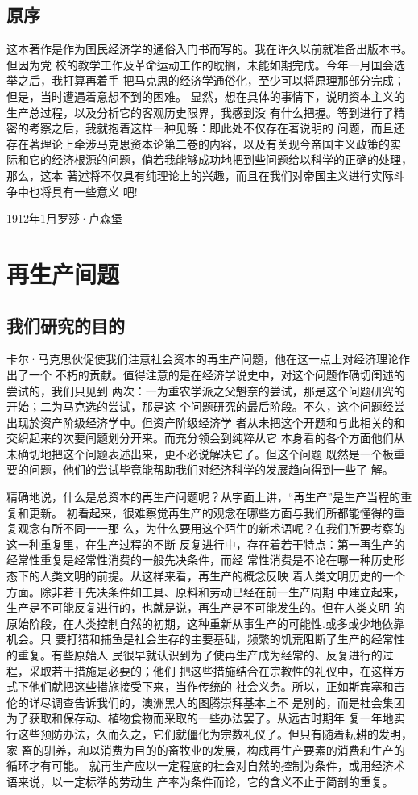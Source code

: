
\chapter*{原序}

这本著作是作为国民经济学的通俗入门书而写的。我在许久以前就准备出版本书。但因为党
校的教学工作及革命运动工作的耽搁，未能如期完成。今年一月国会选举之后，我打算再着手
把马克思的经济学通俗化，至少可以将原理那部分完成；但是，当时遭遇着意想不到的困难。
显然，想在具体的事情下，说明资本主义的生产总过程，以及分析它的客观历史限界，我感到没
有什么把握。等到进行了精密的考察之后，我就抱着这样一种见解：即此处不仅存在著说明的
问题，而且还存在著理论上牵涉马克思资本论第二卷的内容，以及有关现今帝国主义政策的实
际和它的经济根源的问题，倘若我能够成功地把到些问题给以科学的正确的处理，那么，这本
著述将不仅具有纯理论上的兴趣，而且在我们对帝国主义进行实际斗争中也将具有一些意义
吧!

1912年1月罗莎·卢森堡

\part{再生产间题}
\chapter{我们研究的目的}

卡尔·马克思伙促使我们注意社会资本的再生产问题，他在这一点上对经济理论作出了一个
不朽的贡献。值得注意的是在经济学说史中，对这个问题作确切闺述的尝试的，我们只见到
两次：一为重农学派之父魁奈的尝试，那是这个问题研究的开始；二为马克选的尝试，那是这
个问题研究的最后阶段。不久，这个问题经尝出现於资产阶级经济学中。但资产阶级经济学
者从未把这个开题和与此相关的和交织起来的次要间题划分开来。而充分领会到纯粹从它
本身看的各个方面他们从未确切地把这个问题表述出来，更不必说解决它了。但这个问题
既然是一个极重要的问题，他们的尝试毕竟能帮助我们对经济科学的发展趋向得到一些了
解。

精确地说，什么是总资本的再生产问题呢？从字面上讲，“再生产”是生产当程的重复和更新。
初看起来，很难察觉再生产的观念在哪些方面与我们所都能懂得的重复观念有所不同一一那
么，为什么要用这个陌生的新术语呢？在我们所要考察的这一种重复里，在生产过程的不断
反复进行中，存在着若干特点：第一再生产的经常性重复是经常性消费的一般先决条件，而经
常性消费是不论在哪一种历史形态下的人类文明的前提。从这样来看，再生产的概念反映
着人类文明历史的一个方面。除非若干先决条件如工具、原料和劳动已经在前一生产周期
中建立起来，生产是不可能反复进行的，也就是说，再生产是不可能发生的。但在人类文明
的原始阶段，在人类控制自然的初期，这种重新从事生产的可能性.或多或少地依靠机会。只
要打猎和捕鱼是社会生存的主要基础，频繁的饥荒阻断了生产的经常性的重复。有些原始人
民很早就认识到为了使再生产成为经常的、反复进行的过程，采取若干措施是必要的；他们
把这些措施结合在宗教性的礼仪中，在这样方式下他们就把这些措施接受下来，当作传统的
社会义务。所以，正如斯宾塞和吉伦的详尽调查告诉我们的，澳洲黑人的图腾崇拜基本上不
是別的，而是社会集团为了获取和保存动、植物食物而采取的一些办法罢了。从远古时期年
复一年地实行这些预防办法，久而久之，它们就僵化为宗数礼仪了。但只有随着耘耕的发明，家
畜的驯养，和以消费为目的的畜牧业的发展，构成再生产要素的消费和生产的循环才有可能。
就再生产应以一定程底的社会对自然的控制为条件，或用经济术语来说，以一定标準的劳动生
产率为条件而论，它的含义不止于简剖的重复。

